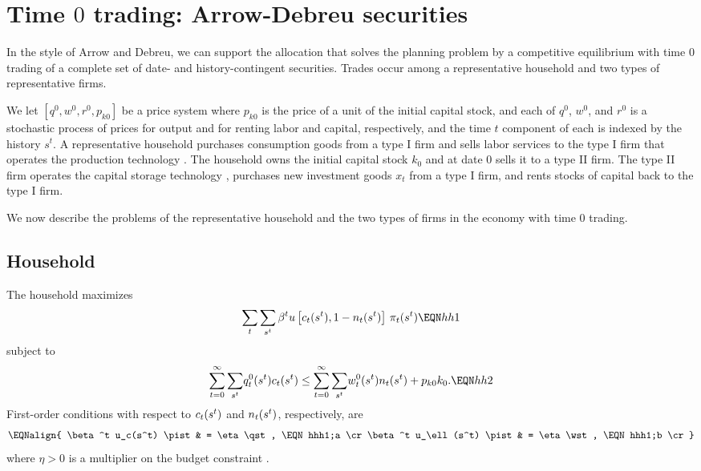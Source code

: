 \section{Time $0$ trading: Arrow-Debreu securities}
In the style of Arrow and Debreu, we can support the allocation
that solves the planning problem by a competitive equilibrium with
time $0$ trading of a complete set of date- and
history-contingent securities.  Trades occur among a
representative household and two types of representative
firms.


We let $[q^0,  w^0, r^0, p_{k0}]$ be a price system where
$p_{k0}$ is the price of a unit of the initial capital stock, and
each of $q^0$, $w^0$, and $r^0$ is a stochastic process of prices for
output and for renting labor and capital, respectively, and   the
time $t$ component of each is indexed by the history $s^t$. A
representative household purchases consumption goods from a type I
firm and sells labor services to the type I firm that operates
the production technology .
The household owns the initial capital stock $k_0$ and at date
$0$ sells it to a type II firm.  The type II firm operates the
capital storage technology , purchases new investment
goods $x_{t}$ from a type I firm, and rents stocks of capital back
to the type I firm.


 We now describe the problems of the
representative household and the two types of firms in the economy
with time $0$ trading.


\subsection{Household}
The household maximizes
$$ \sum_t\sum_{s^t} \beta^t u\left[\cst, 1-\nst\right]\,\pist  \EQN hh1 $$
subject to
$$ \sumst \qst \cst \leq \sumst \wst \nst + p_{k0} k_0. \EQN hh2  $$
First-order conditions with respect to ${c_t(s^t)}$ and ${n_t(s^t)}$, respectively,
are
$$\EQNalign{ \beta^t u_c(s^t) \pist & = \eta\qst, \EQN hhh1;a \cr
                   \beta^t u_\ell(s^t) \pist & = \eta \wst, \EQN hhh1;b \cr}$$
where $\eta>0$ is a multiplier on the budget constraint
.



